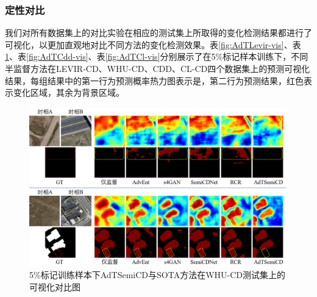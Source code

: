 \documentclass[lang=chs, degree=master, blindreview=false, adobe=false]{yanputhesis}
\begin{document}
\subsubsection{定性对比}
我们对所有数据集上的对比实验在相应的测试集上所取得的变化检测结果都进行了可视化，以更加直观地对比不同方法的变化检测效果。表\ref{fig:AdTLevir-vis}、表\ref{fig:AdTWhu-vis}、表\ref{fig:AdTCdd-vis}、表\ref{fig:AdTCl-vis}分别展示了在5$\%$标记样本训练下，不同半监督方法在LEVIR-CD、WHU-CD、CDD、CL-CD四个数据集上的预测可视化结果，每组结果中的第一行为预测概率热力图表示是，第二行为预测结果，红色表示变化区域，其余为背景区域。
\begin{figure}[!htbp]
  \centering
  \includegraphics[scale=0.45]{images/AdTwhu-vis.png}
  \caption{
    5$\%$标记训练样本下AdTSemiCD与SOTA方法在WHU-CD测试集上的可视化对比图
  }
  \label{fig:AdTWhu-vis}
\end{figure}
\end{document}

